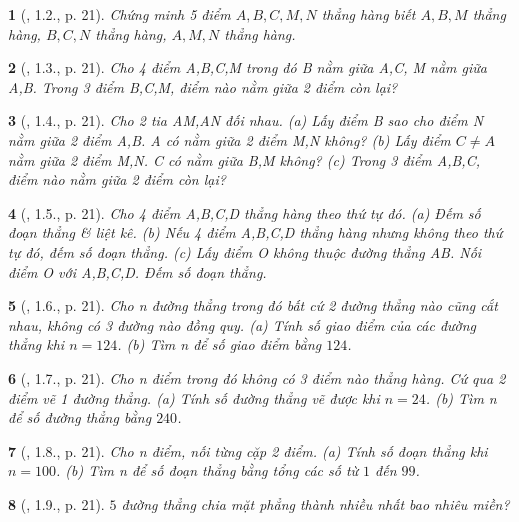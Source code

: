 \documentclass{article}
\newtheorem{baitoan}{}
\begin{document}
\begin{baitoan}[\cite{TLCT_THCS_Toan_6_hinh_hoc}, 1.2., p. 21]
	Chứng minh 5 điểm $A,B,C,M,N$ thẳng hàng biết $A,B,M$ thẳng hàng, $B,C,N$ thẳng hàng, $A,M,N$ thẳng hàng.
\end{baitoan}

\begin{baitoan}[\cite{TLCT_THCS_Toan_6_hinh_hoc}, 1.3., p. 21]
	Cho 4 điểm A,B,C,M trong đó B nằm giữa A,C, M nằm giữa A,B. Trong 3 điểm B,C,M, điểm nào nằm giữa 2 điểm còn lại?
\end{baitoan}

\begin{baitoan}[\cite{TLCT_THCS_Toan_6_hinh_hoc}, 1.4., p. 21]
	Cho 2 tia AM,AN đối nhau. (a) Lấy điểm B sao cho điểm N nằm giữa 2 điểm A,B. A có nằm giữa 2 điểm M,N không? (b) Lấy điểm $C\ne A$ nằm giữa 2 điểm M,N. C có nằm giữa B,M không? (c) Trong 3 điểm A,B,C, điểm nào nằm giữa 2 điểm còn lại?
\end{baitoan}

\begin{baitoan}[\cite{TLCT_THCS_Toan_6_hinh_hoc}, 1.5., p. 21]
	Cho 4 điểm A,B,C,D thẳng hàng theo thứ tự đó. (a) Đếm số đoạn thẳng \& liệt kê. (b) Nếu 4 điểm A,B,C,D thẳng hàng nhưng không theo thứ tự đó, đếm số đoạn thẳng. (c) Lấy điểm O không thuộc đường thẳng AB. Nối điểm O với A,B,C,D. Đếm số đoạn thẳng.
\end{baitoan}

\begin{baitoan}[\cite{TLCT_THCS_Toan_6_hinh_hoc}, 1.6., p. 21]
	Cho n đường thẳng trong đó bất cứ 2 đường thẳng nào cũng cắt nhau, không có 3 đường nào đồng quy. (a) Tính số giao điểm của các đường thẳng khi $n = 124$. (b) Tìm n để số giao điểm bằng $124$.
\end{baitoan}

\begin{baitoan}[\cite{TLCT_THCS_Toan_6_hinh_hoc}, 1.7., p. 21]
	Cho n điểm trong đó không có 3 điểm nào thẳng hàng. Cứ qua 2 điểm vẽ 1 đường thẳng. (a) Tính số đường thẳng vẽ được khi $n = 24$. (b) Tìm n để số đường thẳng bằng $240$.
\end{baitoan}

\begin{baitoan}[\cite{TLCT_THCS_Toan_6_hinh_hoc}, 1.8., p. 21]
	Cho n điểm, nối từng cặp 2 điểm. (a) Tính số đoạn thẳng khi $n = 100$. (b) Tìm n để số đoạn thẳng bằng tổng các số từ $1$ đến $99$.
\end{baitoan}

\begin{baitoan}[\cite{TLCT_THCS_Toan_6_hinh_hoc}, 1.9., p. 21]
	$5$ đường thẳng chia mặt phẳng thành nhiều nhất bao nhiêu miền?
\end{baitoan}
\end{document}
